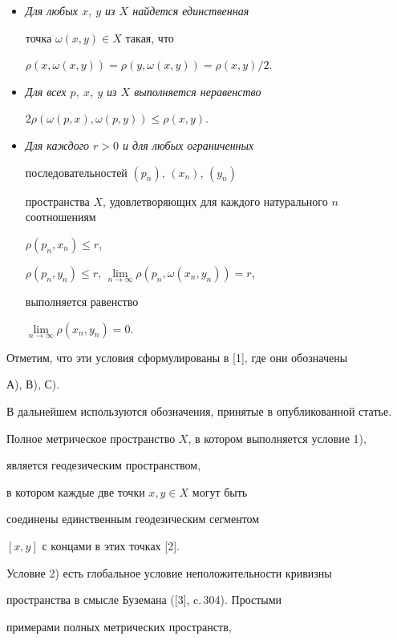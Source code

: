 \begin{itemize}


\item[1)] {\it Для любых $x$, $y$ из $X$ найдется единственная 


точка $\omega (x,y) \in X$ такая, что}


$\rho (x,\omega (x,y)) = \rho (y,\omega (x,y)) = \rho (x,y)/2.$


\item[2)] {\it Для всех $p$, $x$, $y$ из $X$ выполняется неравенство}


$2\rho (\omega (p,x),\omega (p,y)) \leq \rho (x,y).$ 


\item[3)] {\it Для каждого $r > 0$ и для любых ограниченных


последовательностей $(p_{n})$, $(x_{n})$, $(y_{n})$ 


пространства $X$, удовлетворяющих для каждого натурального $n$ соотношениям


$\rho (p_{n},x_{n}){\leq}r$,


$\rho (p_{n},y_{n}) \leq r$, $\lim \limits_{n \to 


\infty}{\rho(p_{n},\omega (x_{n},y_{n}))}=r$, 


выполняется равенство}


$\lim \limits_{n \to \infty}{\rho(x_{n},y_{n})} = 0$.


\end{itemize}


Отметим, что эти условия сформулированы в [1], где они обозначены


А), В), С).





В дальнейшем используются обозначения, принятые в опубликованной статье. 


Полное метрическое пространство $X$, в котором выполняется условие 1), 


является геодезическим пространством, 


в котором каждые две точки $x, y \in X$ могут быть


соединены единственным геодезическим сегментом


$[x,y]$ с концами в этих точках [2].


Условие 2) есть глобальное условие неположительности кривизны 


пространства в смысле Буземана ([3], c.\,304). Простыми 


примерами полных метрических пространств, 



